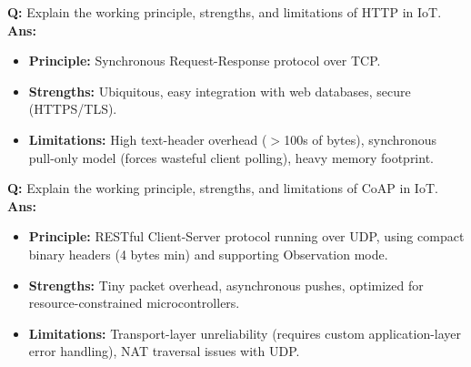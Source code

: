 \documentclass[10pt,a4paper,twocolumn]{article}
\begin{document}
\begin{tcolorbox}[
  colback=white,
  colframe=UnitColorThree,
  colbacktitle=gray!10!white,
  coltitle=black,
  fonttitle=\bfseries\sffamily\small,
  title={Unit III $\bullet$ Card 13},
  boxrule=1.2pt,
  arc=2mm,
  outer arc=2mm,
  boxsep=1.5mm,
  top=1mm,
  bottom=1mm,
  left=1.5mm,
  right=1.5mm,
  before skip=2.5mm,
  after skip=2.5mm
]
\textbf{Q:} Explain the working principle, strengths, and limitations of HTTP in IoT.
\tcbline
\textbf{Ans:} \begin{itemize}
  \item \textbf{Principle:} Synchronous Request-Response protocol over TCP.
  \item \textbf{Strengths:} Ubiquitous, easy integration with web databases, secure (HTTPS/TLS).
  \item \textbf{Limitations:} High text-header overhead ($>$100s of bytes), synchronous pull-only model (forces wasteful client polling), heavy memory footprint.
\end{itemize}
\end{tcolorbox}


\begin{tcolorbox}[
  colback=white,
  colframe=UnitColorThree,
  colbacktitle=gray!10!white,
  coltitle=black,
  fonttitle=\bfseries\sffamily\small,
  title={Unit III $\bullet$ Card 14},
  boxrule=1.2pt,
  arc=2mm,
  outer arc=2mm,
  boxsep=1.5mm,
  top=1mm,
  bottom=1mm,
  left=1.5mm,
  right=1.5mm,
  before skip=2.5mm,
  after skip=2.5mm
]
\textbf{Q:} Explain the working principle, strengths, and limitations of CoAP in IoT.
\tcbline
\textbf{Ans:} \begin{itemize}
  \item \textbf{Principle:} RESTful Client-Server protocol running over UDP, using compact binary headers (4 bytes min) and supporting Observation mode.
  \item \textbf{Strengths:} Tiny packet overhead, asynchronous pushes, optimized for resource-constrained microcontrollers.
  \item \textbf{Limitations:} Transport-layer unreliability (requires custom application-layer error handling), NAT traversal issues with UDP.
\end{itemize}
\end{tcolorbox}
\end{document}
